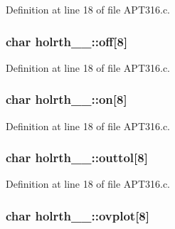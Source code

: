 Definition at line 18 of file A\+P\+T316.\+c.

\subsubsection[{\texorpdfstring{off}{off}}]{\setlength{\rightskip}{0pt plus 5cm}char holrth\+\_\+\_\+\+::off\mbox{[}8\mbox{]}}\hypertarget{structholrth__1___aaf6a68c43c88c6eccb4733b4709ba1f7}{}\label{structholrth__1___aaf6a68c43c88c6eccb4733b4709ba1f7}


Definition at line 18 of file A\+P\+T316.\+c.

\subsubsection[{\texorpdfstring{on}{on}}]{\setlength{\rightskip}{0pt plus 5cm}char holrth\+\_\+\_\+\+::on\mbox{[}8\mbox{]}}\hypertarget{structholrth__1___a73eb82d2bea5a7eb20511c50a6c14225}{}\label{structholrth__1___a73eb82d2bea5a7eb20511c50a6c14225}


Definition at line 18 of file A\+P\+T316.\+c.

\subsubsection[{\texorpdfstring{outtol}{outtol}}]{\setlength{\rightskip}{0pt plus 5cm}char holrth\+\_\+\_\+\+::outtol\mbox{[}8\mbox{]}}\hypertarget{structholrth__1___a85d609d0e370f6b88d98799bbdd894e9}{}\label{structholrth__1___a85d609d0e370f6b88d98799bbdd894e9}


Definition at line 18 of file A\+P\+T316.\+c.

\subsubsection[{\texorpdfstring{ovplot}{ovplot}}]{\setlength{\rightskip}{0pt plus 5cm}char holrth\+\_\+\_\+\+::ovplot\mbox{[}8\mbox{]}}\hypertarget{structholrth__1___a466383973fe32f3731ca50cf4ece72e6}{}\label{structholrth__1___a466383973fe32f3731ca50cf4ece72e6}


